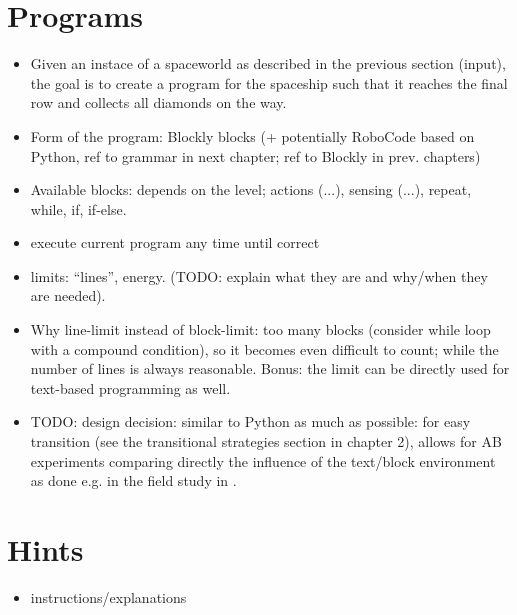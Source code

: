 



\section{Programs}
\label{sec:robomission.programs}

\begin{itemize}
\item Given an instace of a spaceworld as described in the previous section
(input), the goal is to create a program for the spaceship such that it reaches
the final row and collects all diamonds on the way.
\item Form of the program: Blockly blocks (+ potentially RoboCode based on
Python, ref to grammar in next chapter; ref to Blockly in prev. chapters)
\item Available blocks: depends on the level;
  actions (...), sensing (...), repeat, while, if, if-else.
\item execute current program any time until correct
\item limits: ``lines'', energy.
  (TODO: explain what they are and why/when they are needed).
\item Why line-limit instead of block-limit: too many blocks (consider while
  loop with a compound condition), so it becomes even difficult to count;
  while the number of lines is always reasonable.
  Bonus: the limit can be directly used for text-based programming as well.
\item TODO: design decision: similar to Python as much as possible: for easy transition
(see the transitional strategies section in chapter 2), allows for AB experiments
comparing directly the influence of the text/block environment as done e.g.
in the field study in \cite{comparing-blocks-text-weintrop2017}.
\end{itemize}




\section{Hints}
\begin{itemize}
\item instructions/explanations
\end{itemize}

